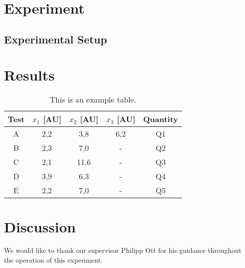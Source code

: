 \documentclass[twocolumn,
			   showpacs,%
               nofootinbib,
               aps,%
               prd,
               notitlepage,
               showkeys,
               10pt]{revtex4-1}
\begin{document}
\blindtext





\section{Experiment}




\subsection{Experimental Setup}


\blindtext




\section{Results}
\blindtext



\begin{table}[!htbp]
\centering
\setlength{\tabcolsep}{2mm}
\renewcommand{\arraystretch}{1.5}
\begin{tabular}{|c||c|c|c|c|}
\hline
Test & $x_1$ [AU] & $x_2$ [AU] & $x_3$ [AU] & Quantity \\ \hline \hline
A & 2,2 & 3,8 & 6,2 & Q1 \\
\hline
B & 2,3 & 7,0 & - & Q2 \\
\hline
C & 2,1 & 11,6 & - & Q3 \\
\hline
D & 3,9 & 6,3 & - & Q4\\
\hline
E & 2,2 & 7,0 & - & Q5 \\
\hline
\end{tabular}
\caption{\label{tab:test}This is an example table.}
\end{table}




\section{Discussion}

\Blindtext


\begin{acknowledgments}

We would like to thank our supervisor Philipp Ott for his guidance throughout the operation of this experiment.

\end{acknowledgments}




\nocite{*}
\end{document}
